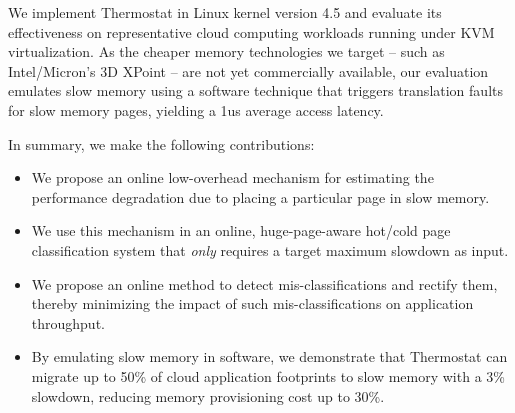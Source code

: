 We implement Thermostat in Linux kernel version 4.5 and evaluate its effectiveness on
representative cloud computing workloads running under KVM virtualization. 
As the cheaper memory technologies we target -- such as Intel/Micron's 3D XPoint
-- are not yet commercially
available, our evaluation emulates slow memory using a software technique that triggers
translation faults for slow memory pages, yielding a 1us average
access latency.


In summary, we make the following contributions: 
\begin{itemize}
\item We propose an online low-overhead mechanism for
estimating the performance degradation due to placing a particular page
in slow memory.
\item We use this mechanism in an online, huge-page-aware hot/cold page
classification system that {\it only} requires a target maximum slowdown
as input.
\item We propose an online method to detect mis-classifications and rectify them,
thereby minimizing the impact of such mis-classifications on application
throughput.
\item By emulating slow memory in software, we demonstrate that Thermostat can
migrate up to 50\% of cloud application footprints to slow memory with
a 3\% slowdown, reducing memory provisioning cost up to 30\%.
\end{itemize}

